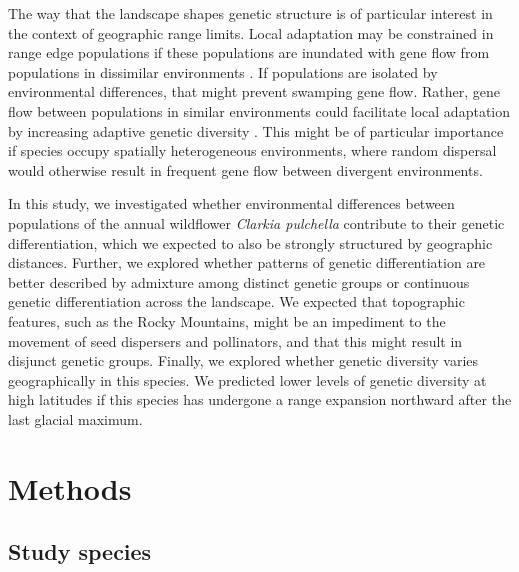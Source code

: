 \documentclass{article}
\begin{document}
The way that the landscape shapes genetic structure is of particular interest in the context of geographic range limits. Local adaptation may be constrained in range edge populations if these populations are inundated with gene flow from populations in dissimilar environments \citep{kirkpatrick1997evolution}. If populations are isolated by environmental differences, that might prevent swamping gene flow. Rather, gene flow between populations in similar environments could facilitate local adaptation by increasing adaptive genetic diversity \citep{sexton2011gene}. This might be of particular importance if species occupy spatially heterogeneous environments, where random dispersal would otherwise result in frequent gene flow between divergent environments. 

In this study, we investigated whether environmental differences between populations of the annual wildflower \textit{Clarkia pulchella} contribute to their genetic differentiation, which we expected to also be strongly structured by geographic distances. Further, we explored whether patterns of genetic differentiation are better described by admixture among distinct genetic groups or continuous genetic differentiation across the landscape. We expected that topographic features, such as the Rocky Mountains, might be an impediment to the movement of seed dispersers and pollinators, and that this might result in disjunct genetic groups. Finally, we explored whether genetic diversity varies geographically in this species. We predicted lower levels of genetic diversity at high latitudes if this species has undergone a range expansion northward after the last glacial maximum.

\section*{Methods}

\subsection*{Study species}
\end{document}

